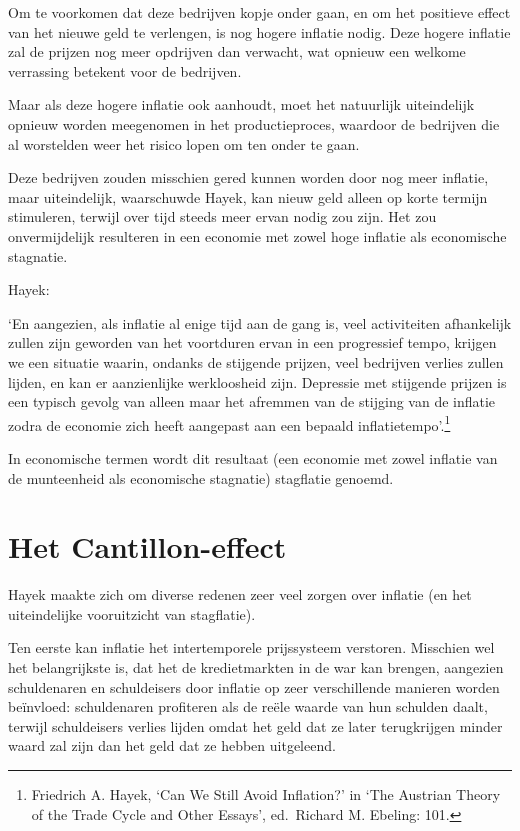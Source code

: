 \documentclass[smalldemyvopaper,11pt,twoside,onecolumn,openright,extrafontsizes,hidelinks]{memoir}
\begin{document}
Om te voorkomen dat deze bedrijven kopje onder gaan, en om het positieve
effect van het nieuwe geld te verlengen, is nog hogere inflatie nodig.
Deze hogere inflatie zal de prijzen nog meer opdrijven dan verwacht, wat
opnieuw een welkome verrassing betekent voor de bedrijven.

Maar als deze hogere inflatie ook aanhoudt, moet het natuurlijk
uiteindelijk opnieuw worden meegenomen in het productieproces, waardoor
de bedrijven die al worstelden weer het risico lopen om ten onder te
gaan.

Deze bedrijven zouden misschien gered kunnen worden door nog meer
inflatie, maar uiteindelijk, waarschuwde Hayek, kan nieuw geld alleen op
korte termijn stimuleren, terwijl over tijd steeds meer ervan nodig zou
zijn. Het zou onvermijdelijk resulteren in een economie met zowel hoge
inflatie als economische stagnatie.

Hayek:

`En aangezien, als inflatie al enige tijd aan de gang is, veel
activiteiten afhankelijk zullen zijn geworden van het voortduren ervan
in een progressief tempo, krijgen we een situatie waarin, ondanks de
stijgende prijzen, veel bedrijven verlies zullen lijden, en kan er
aanzienlijke werkloosheid zijn. Depressie met stijgende prijzen is een
typisch gevolg van alleen maar het afremmen van de stijging van de
inflatie zodra de economie zich heeft aangepast aan een bepaald
inflatietempo'.\footnote{\hspace{0pt}Friedrich A. Hayek, `Can We Still
  Avoid Inflation?' in `The Austrian Theory of the Trade Cycle and Other
  Essays', ed.~Richard M. Ebeling: 101.}

In economische termen wordt dit resultaat (een economie met zowel
inflatie van de munteenheid als economische stagnatie) stagflatie
genoemd.

\section{Het Cantillon-effect}\label{het-cantillon-effect}

Hayek maakte zich om diverse redenen zeer veel zorgen over inflatie (en
het uiteindelijke vooruitzicht van stagflatie).

Ten eerste kan inflatie het intertemporele prijssysteem verstoren.
Misschien wel het belangrijkste is, dat het de kredietmarkten in de war
kan brengen, aangezien schuldenaren en schuldeisers door inflatie op
zeer verschillende manieren worden beïnvloed: schuldenaren profiteren
als de reële waarde van hun schulden daalt, terwijl schuldeisers verlies
lijden omdat het geld dat ze later terugkrijgen minder waard zal zijn
dan het geld dat ze hebben uitgeleend.
\end{document}
